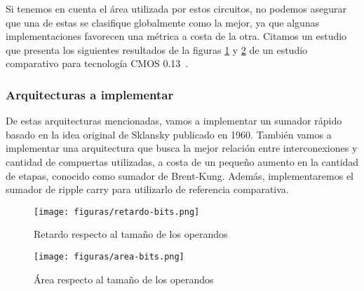 Si tenemos en cuenta el área utilizada por estos circuitos, no podemos asegurar que una de estas se clasifique globalmente como la mejor, ya que algunas implementaciones favorecen una métrica a costa de la otra. Citamos un estudio que presenta los siguientes resultados de la figuras \ref{retardo-bits} y \ref{area-bits} de un estudio comparativo \cite{estrada-gimenez} para tecnología CMOS 0.13~\microm.

\subsubsection{Arquitecturas a implementar}
De estas arquitecturas mencionadas, vamos a implementar un sumador rápido basado en la idea original de Sklansky\cite{sklansky} publicado en 1960. También vamos a implementar una arquitectura que busca la mejor relación entre interconexiones y cantidad de compuertas utilizadas, a costa de un pequeño aumento en la cantidad de etapas, conocido como sumador de Brent-Kung\cite{brent-kung}. Además, implementaremos el sumador de ripple carry para utilizarlo de referencia comparativa.


\begin{figure}[h]
  \centering
\texttt{[image: figuras/retardo-bits.png]}
\vspace{-5pt}
  \caption{Retardo respecto al tamaño de los operandos}
  \label{retardo-bits}
\vspace{-5pt}
\end{figure}


\begin{figure}[h]
  \centering
\texttt{[image: figuras/area-bits.png]}
\vspace{-1pt}
  \caption{Área respecto al tamaño de los operandos}
  \label{area-bits}
\vspace{-15pt}
\end{figure}

